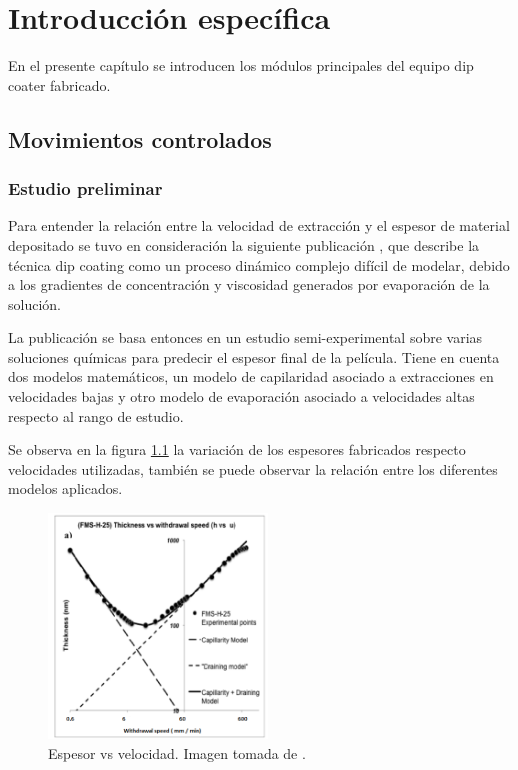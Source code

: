 
\chapter{Introducción específica} %

\label{Chapter2} %

En el presente capítulo se introducen los módulos principales del equipo dip coater fabricado.   

\section{Movimientos controlados}
\subsection{Estudio preliminar}

Para entender la relación entre la velocidad de extracción y el espesor de material depositado se tuvo en consideración la siguiente publicación \cite{paper_galo}, que describe la técnica dip coating como un proceso dinámico complejo difícil de modelar, debido a los gradientes de concentración y viscosidad generados por evaporación de la solución. 


La publicación se basa entonces en un estudio semi-experimental sobre varias soluciones químicas para predecir el espesor final de la película. Tiene en cuenta dos modelos matemáticos, un modelo de capilaridad asociado a extracciones en velocidades bajas y otro modelo de evaporación asociado a velocidades altas respecto al rango de estudio. 

Se observa en la figura \ref{fig:paper_galo} la variación de los espesores fabricados respecto velocidades utilizadas, también se puede observar la relación entre los diferentes modelos aplicados. 

\begin{figure}[!h]
\centering 
\includegraphics[width=0.52\textwidth]{./Figures/paper_galo.png}
\caption{Espesor vs velocidad. Imagen tomada de \cite{paper_galo}.}
\label{fig:paper_galo}
\end{figure}

